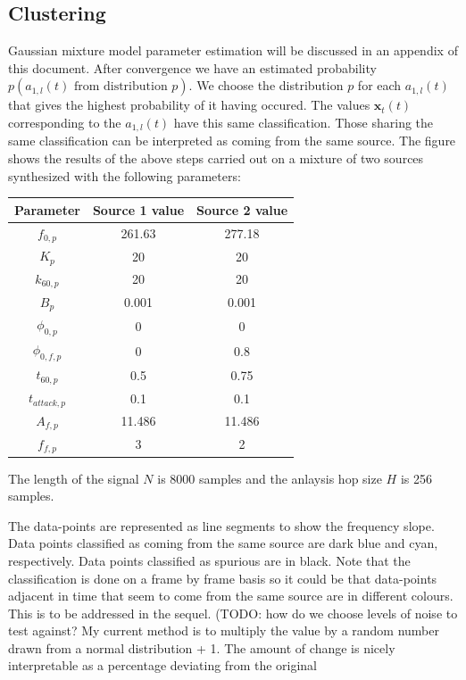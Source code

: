 \documentclass[letterpaper,12pt]{report}
\begin{document}
\subsection{Clustering}
Gaussian mixture model parameter estimation will be discussed in an appendix of
this document. After convergence we have an estimated probability
$p(a_{1,l}(t) \text{ from distribution }p)$. We choose the
distribution $p$ for each $a_{1,l}(t)$ that gives the highest probability of it
having occured. The values $\mathbf{x}_{t}(t)$ corresponding to the $a_{1,l}(t)$
have this same classification. Those sharing the same classification can be
interpreted as coming from the same source. The figure shows the results of the
above steps carried out on a mixture of two sources synthesized with the
following parameters:
\begin{table}
    \begin{center}
        \begin{tabular}{c c c }
            Parameter & Source 1 value & Source 2 value \\
            \hline
            $f_{0,p}$ & 261.63 & 277.18 \\
            $K_{p}$ & 20 & 20 \\
            $k_{60,p}$ & 20 & 20 \\
            $B_{p}$ & 0.001 & 0.001 \\
            $\phi_{0,p}$ & 0 & 0 \\
            $\phi_{0,f,p}$ & 0 & 0.8 \\
            $t_{60,p}$ & 0.5 & 0.75 \\
            $t_{attack,p}$ & 0.1 & 0.1 \\
            $A_{f,p}$ & 11.486 & 11.486 \\
            $f_{f,p}$ & 3 & 2
        \end{tabular}
    \end{center}
\end{table}
The length of the signal $N$ is 8000 samples and the anlaysis hop size $H$ is 256
samples.


The data-points are represented as line segments to show the frequency slope.
Data points classified as coming from the same source are dark blue and cyan,
respectively.  Data points classified as spurious are in black. Note that the
classification is done on a frame by frame basis so it could be that data-points
adjacent in time that seem to come from the same source are in different
colours. This is to be addressed in the sequel.
(TODO: how do we choose levels of noise to test against? My current method is to
multiply the value by a random number drawn from a normal distribution + 1. The amount
of change is nicely interpretable as a percentage deviating from the original
\end{document}
